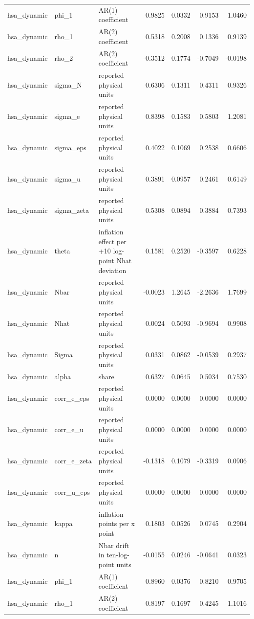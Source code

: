 \begin{tabular}{lllrrrr}
hsa\_dynamic & phi\_1 & AR(1) coefficient & 0.9825 & 0.0332 & 0.9153 & 1.0460 \\
hsa\_dynamic & rho\_1 & AR(2) coefficient & 0.5318 & 0.2008 & 0.1336 & 0.9139 \\
hsa\_dynamic & rho\_2 & AR(2) coefficient & -0.3512 & 0.1774 & -0.7049 & -0.0198 \\
hsa\_dynamic & sigma\_N & reported physical units & 0.6306 & 0.1311 & 0.4311 & 0.9326 \\
hsa\_dynamic & sigma\_e & reported physical units & 0.8398 & 0.1583 & 0.5803 & 1.2081 \\
hsa\_dynamic & sigma\_eps & reported physical units & 0.4022 & 0.1069 & 0.2538 & 0.6606 \\
hsa\_dynamic & sigma\_u & reported physical units & 0.3891 & 0.0957 & 0.2461 & 0.6149 \\
hsa\_dynamic & sigma\_zeta & reported physical units & 0.5308 & 0.0894 & 0.3884 & 0.7393 \\
hsa\_dynamic & theta & inflation effect per +10 log-point Nhat deviation & 0.1581 & 0.2520 & -0.3597 & 0.6228 \\
hsa\_dynamic & Nbar & reported physical units & -0.0023 & 1.2645 & -2.2636 & 1.7699 \\
hsa\_dynamic & Nhat & reported physical units & 0.0024 & 0.5093 & -0.9694 & 0.9908 \\
hsa\_dynamic & Sigma & reported physical units & 0.0331 & 0.0862 & -0.0539 & 0.2937 \\
hsa\_dynamic & alpha & share & 0.6327 & 0.0645 & 0.5034 & 0.7530 \\
hsa\_dynamic & corr\_e\_eps & reported physical units & 0.0000 & 0.0000 & 0.0000 & 0.0000 \\
hsa\_dynamic & corr\_e\_u & reported physical units & 0.0000 & 0.0000 & 0.0000 & 0.0000 \\
hsa\_dynamic & corr\_e\_zeta & reported physical units & -0.1318 & 0.1079 & -0.3319 & 0.0906 \\
hsa\_dynamic & corr\_u\_eps & reported physical units & 0.0000 & 0.0000 & 0.0000 & 0.0000 \\
hsa\_dynamic & kappa & inflation points per x point & 0.1803 & 0.0526 & 0.0745 & 0.2904 \\
hsa\_dynamic & n & Nbar drift in ten-log-point units & -0.0155 & 0.0246 & -0.0641 & 0.0323 \\
hsa\_dynamic & phi\_1 & AR(1) coefficient & 0.8960 & 0.0376 & 0.8210 & 0.9705 \\
hsa\_dynamic & rho\_1 & AR(2) coefficient & 0.8197 & 0.1697 & 0.4245 & 1.1016 \\

\end{tabular}
